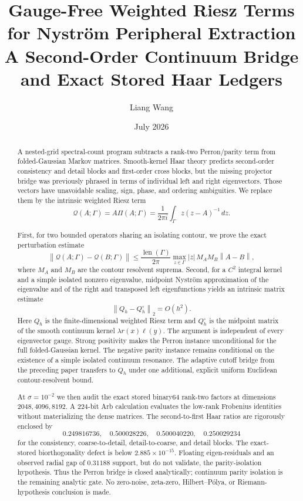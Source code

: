 \documentclass[11pt]{article}
\title{Gauge-Free Weighted Riesz Terms for Nystr\"om Peripheral Extraction\\
\large A Second-Order Continuum Bridge and Exact Stored Haar Ledgers}
\author{Liang Wang}
\date{July 2026}
\theoremstyle{definition}
\theoremstyle{remark}
\newcommand{\norm}[1]{\left\lVert #1\right\rVert}
\newcommand{\cQ}{\mathcal Q}
\newcommand{\len}{\operatorname{len}}
\begin{document}
\maketitle

\begin{abstract}
A nested-grid spectral-count program subtracts a rank-two Perron/parity term
from folded-Gaussian Markov matrices.  Smooth-kernel Haar theory predicts
second-order consistency and detail blocks and first-order cross blocks, but
the missing projector bridge was previously phrased in terms of individual
left and right eigenvectors.  Those vectors have unavoidable scaling, sign,
phase, and ordering ambiguities.  We replace them by the intrinsic weighted
Riesz term
\[
 \cQ(A;\Gamma)=A\Pi(A;\Gamma)
 =\frac{1}{2\pi i}\int_\Gamma z(z-A)^{-1}\,dz.
\]

First, for two bounded operators sharing an isolating contour, we prove the
exact perturbation estimate
\[
 \norm{\cQ(A;\Gamma)-\cQ(B;\Gamma)}
 \le \frac{\len(\Gamma)}{2\pi}
       \max_{z\in\Gamma}|z|\,M_A M_B\norm{A-B},
\]
where $M_A$ and $M_B$ are the contour resolvent suprema.  Second, for a
$C^2$ integral kernel and a simple isolated nonzero eigenvalue, midpoint
Nystr\"om approximation of the eigenvalue and of the right and transposed
left eigenfunctions yields an intrinsic matrix estimate
\[
 \norm{Q_h-Q_h^\circ}_2=O(h^2).
\]
Here $Q_h$ is the finite-dimensional weighted Riesz term and $Q_h^\circ$ is
the midpoint matrix of the smooth continuum kernel
$\lambda r(x)\ell(y)$.  The argument is independent of every eigenvector
gauge.  Strong positivity makes the Perron instance unconditional for the
full folded-Gaussian kernel.  The negative parity instance remains
conditional on the existence of a simple isolated continuum resonance.
The adaptive cutoff bridge from the preceding paper transfers to $Q_h$ under
one additional, explicit uniform Euclidean contour-resolvent bound.

At $\sigma=10^{-2}$ we then audit the exact stored binary64 rank-two factors
at dimensions $2048,4096,8192$.  A 224-bit Arb calculation evaluates the
low-rank Frobenius identities without materializing the dense matrices.  The
second-to-first Haar ratios are rigorously enclosed by
\[
 0.249816736,\quad0.500028226,\quad0.500040220,\quad0.250029234
\]
for the consistency, coarse-to-detail, detail-to-coarse, and detail blocks.
The exact-stored biorthogonality defect is below
$2.885\times10^{-15}$.  Floating eigen-residuals and an observed radial gap
of $0.31188$ support, but do not validate, the parity-isolation hypothesis.
Thus the Perron bridge is closed analytically; continuum parity isolation is
the remaining analytic gate.  No zero-noise, zeta-zero, Hilbert--P\'olya, or
Riemann-hypothesis conclusion is made.
\end{abstract}
\end{document}
